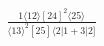 \documentclass[varwidth, border=5pt]{standalone}
\begin{document}
\begin{my}
$\begin{gathered}
\scriptscriptstyle\frac{1⟨12⟩[24]^2⟨25⟩}{⟨13⟩^2[25]⟨2|1+3|2]}
\end{gathered}$
\end{my}
\end{document}
